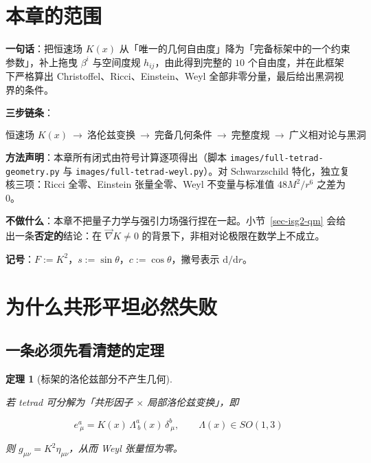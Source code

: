 \documentclass[
  chinese,
  a4paper,
  UTF8,
  12pt,
  oneside,
  openany]{ctexbook}
\theoremstyle{plain}
\newtheorem{theorem}{定理}[chapter]
\theoremstyle{plain}
\theoremstyle{plain}
\theoremstyle{definition}
\theoremstyle{plain}
\theoremstyle{plain}
\theoremstyle{remark}
\begin{document}
\section{本章的范围}\label{sec-isg2-scope}

\textbf{一句话}：把恒速场 \(K(x)\)
从「唯一的几何自由度」降为「完备标架中的一个约束参数」，补上拖曳
\(\beta^{i}\) 与空间度规 \(h_{ij}\)，由此得到完整的 \(10\)
个自由度，并在此框架下严格算出 Christoffel、Ricci、Einstein、Weyl
全部非零分量，最后给出黑洞视界的条件。

\textbf{三步链条}：

\[
\text{恒速场 } K(x)\ \longrightarrow\ \text{洛伦兹变换}\ \longrightarrow\ \text{完备几何条件}\ \longrightarrow\ \text{完整度规}\ \longrightarrow\ \text{广义相对论与黑洞}
\]

\textbf{方法声明}：本章所有闭式由符号计算逐项得出（脚本
\texttt{images/full-tetrad-geometry.py} 与
\texttt{images/full-tetrad-weyl.py}）。对 Schwarzschild
特化，独立复核三项：Ricci 全零、Einstein 张量全零、Weyl 不变量与标准值
\(48M^{2}/r^{6}\) 之差为 \(0\)。

\textbf{不做什么}：本章不把量子力学与强引力场强行捏在一起。小节~\ref{sec-isg2-qm}
会给出一条\textbf{否定的}结论：在 \(\vec\nabla K\neq0\)
的背景下，非相对论极限在数学上不成立。

\textbf{记号}：\(F:=K^{2}\)，\(s:=\sin\theta\)，\(c:=\cos\theta\)，撇号表示
\(\mathrm{d}/\mathrm{d}r\)。

\section{为什么共形平坦必然失败}\label{sec-isg2-nogo}

\subsection{一条必须先看清楚的定理}\label{ux4e00ux6761ux5fc5ux987bux5148ux770bux6e05ux695aux7684ux5b9aux7406}

\begin{theorem}[标架的洛伦兹部分不产生几何]\protect\hypertarget{thm-isg2-nogo}{}\label{thm-isg2-nogo}

若 tetrad 可分解为「共形因子 \(\times\) 局部洛伦兹变换」，即

\[
e^{a}_{\ \mu}=K(x)\,\Lambda^{a}_{\ b}(x)\,\delta^{b}_{\ \mu},\qquad \Lambda(x)\in SO(1,3)
\]

则 \(g_{\mu\nu}=K^{2}\eta_{\mu\nu}\)，从而 Weyl 张量恒为零。

\end{theorem}
\end{document}
